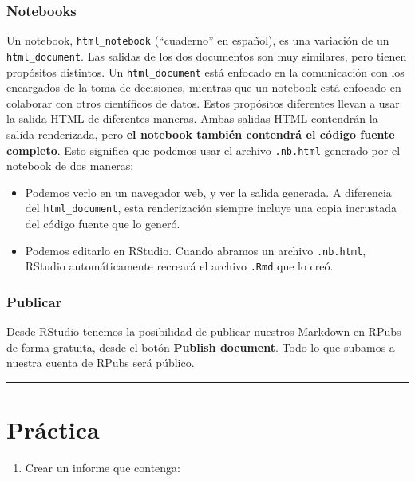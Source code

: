 \documentclass[
]{article}
\providecommand{\tightlist}{%
  \setlength{\itemsep}{0pt}\setlength{\parskip}{0pt}}
\begin{document}
\subsubsection{Notebooks}\label{notebooks}

Un notebook, \texttt{html\_notebook} (``cuaderno'' en español), es una
variación de un \texttt{html\_document}. Las salidas de los dos
documentos son muy similares, pero tienen propósitos distintos. Un
\texttt{html\_document} está enfocado en la comunicación con los
encargados de la toma de decisiones, mientras que un notebook está
enfocado en colaborar con otros científicos de datos. Estos propósitos
diferentes llevan a usar la salida HTML de diferentes maneras. Ambas
salidas HTML contendrán la salida renderizada, pero \textbf{el notebook
también contendrá el código fuente completo}. Esto significa que podemos
usar el archivo \texttt{.nb.html} generado por el notebook de dos
maneras:

\begin{itemize}
\item
  Podemos verlo en un navegador web, y ver la salida generada. A
  diferencia del \texttt{html\_document}, esta renderización siempre
  incluye una copia incrustada del código fuente que lo generó.
\item
  Podemos editarlo en RStudio. Cuando abramos un archivo
  \texttt{.nb.html}, RStudio automáticamente recreará el archivo
  \texttt{.Rmd} que lo creó.
\end{itemize}

\subsubsection{Publicar}\label{publicar}

Desde RStudio tenemos la posibilidad de publicar nuestros Markdown en
\href{https://rpubs.com/}{RPubs} de forma gratuita, desde el botón
\textbf{Publish document}. Todo lo que subamos a nuestra cuenta de RPubs
será público.

\begin{center}\rule{0.5\linewidth}{0.5pt}\end{center}

\section{Práctica}\label{pruxe1ctica}

\begin{enumerate}
\def\labelenumi{\arabic{enumi})}
\tightlist
\item
  Crear un informe que contenga:
\end{enumerate}
\end{document}
